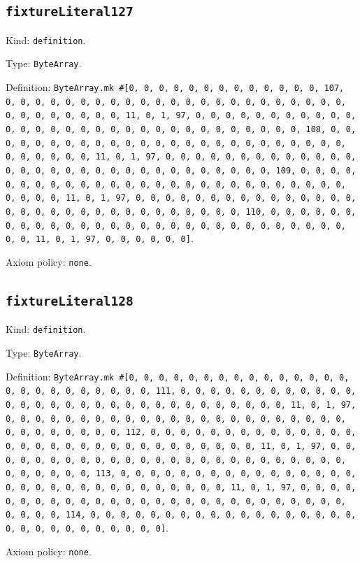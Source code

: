 \documentclass[11pt]{article}
\begin{document}
\subsection*{\texttt{fixtureLiteral127}}
\noindent Kind: \texttt{definition}.\par
\noindent Type: \texttt{ByteArray}.\par
\noindent Definition: \texttt{ByteArray.mk \#[0, 0, 0, 0, 0, 0, 0, 0, 0, 0, 0, 0, 0, 107, 0, 0, 0, 0, 0, 0, 0, 0, 0, 0, 0, 0, 0, 0, 0, 0, 0, 0, 0, 0, 0, 0, 0, 0, 0, 0, 0, 0, 0, 0, 0, 11, 0, 1, 97, 0, 0, 0, 0, 0, 0, 0, 0, 0, 0, 0, 0, 0, 0, 0, 0, 0, 0, 0, 0, 0, 0, 0, 0, 0, 0, 0, 0, 0, 0, 0, 108, 0, 0, 0, 0, 0, 0, 0, 0, 0, 0, 0, 0, 0, 0, 0, 0, 0, 0, 0, 0, 0, 0, 0, 0, 0, 0, 0, 0, 0, 0, 0, 11, 0, 1, 97, 0, 0, 0, 0, 0, 0, 0, 0, 0, 0, 0, 0, 0, 0, 0, 0, 0, 0, 0, 0, 0, 0, 0, 0, 0, 0, 0, 0, 0, 0, 0, 109, 0, 0, 0, 0, 0, 0, 0, 0, 0, 0, 0, 0, 0, 0, 0, 0, 0, 0, 0, 0, 0, 0, 0, 0, 0, 0, 0, 0, 0, 0, 0, 11, 0, 1, 97, 0, 0, 0, 0, 0, 0, 0, 0, 0, 0, 0, 0, 0, 0, 0, 0, 0, 0, 0, 0, 0, 0, 0, 0, 0, 0, 0, 0, 0, 0, 0, 110, 0, 0, 0, 0, 0, 0, 0, 0, 0, 0, 0, 0, 0, 0, 0, 0, 0, 0, 0, 0, 0, 0, 0, 0, 0, 0, 0, 0, 0, 0, 0, 11, 0, 1, 97, 0, 0, 0, 0, 0, 0]}.\par
\noindent Axiom policy: \texttt{none}.\par
\subsection*{\texttt{fixtureLiteral128}}
\noindent Kind: \texttt{definition}.\par
\noindent Type: \texttt{ByteArray}.\par
\noindent Definition: \texttt{ByteArray.mk \#[0, 0, 0, 0, 0, 0, 0, 0, 0, 0, 0, 0, 0, 0, 0, 0, 0, 0, 0, 0, 0, 0, 0, 0, 0, 111, 0, 0, 0, 0, 0, 0, 0, 0, 0, 0, 0, 0, 0, 0, 0, 0, 0, 0, 0, 0, 0, 0, 0, 0, 0, 0, 0, 0, 0, 0, 0, 11, 0, 1, 97, 0, 0, 0, 0, 0, 0, 0, 0, 0, 0, 0, 0, 0, 0, 0, 0, 0, 0, 0, 0, 0, 0, 0, 0, 0, 0, 0, 0, 0, 0, 0, 112, 0, 0, 0, 0, 0, 0, 0, 0, 0, 0, 0, 0, 0, 0, 0, 0, 0, 0, 0, 0, 0, 0, 0, 0, 0, 0, 0, 0, 0, 0, 0, 11, 0, 1, 97, 0, 0, 0, 0, 0, 0, 0, 0, 0, 0, 0, 0, 0, 0, 0, 0, 0, 0, 0, 0, 0, 0, 0, 0, 0, 0, 0, 0, 0, 0, 0, 113, 0, 0, 0, 0, 0, 0, 0, 0, 0, 0, 0, 0, 0, 0, 0, 0, 0, 0, 0, 0, 0, 0, 0, 0, 0, 0, 0, 0, 0, 0, 0, 11, 0, 1, 97, 0, 0, 0, 0, 0, 0, 0, 0, 0, 0, 0, 0, 0, 0, 0, 0, 0, 0, 0, 0, 0, 0, 0, 0, 0, 0, 0, 0, 0, 0, 0, 114, 0, 0, 0, 0, 0, 0, 0, 0, 0, 0, 0, 0, 0, 0, 0, 0, 0, 0, 0, 0, 0, 0, 0, 0, 0, 0, 0, 0, 0]}.\par
\noindent Axiom policy: \texttt{none}.\par
\end{document}
